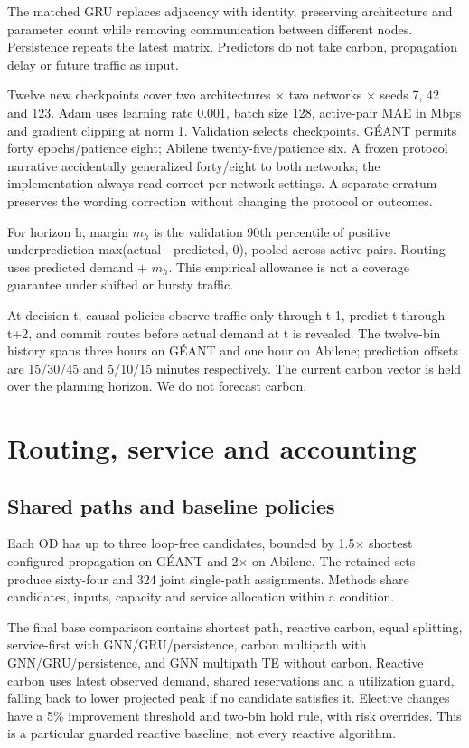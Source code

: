 \documentclass[conference,letterpaper]{IEEEtran}
\begin{document}
The matched GRU replaces adjacency with identity, preserving architecture and parameter count while removing communication between different nodes. Persistence repeats the latest matrix. Predictors do not take carbon, propagation delay or future traffic as input.

Twelve new checkpoints cover two architectures $\times$ two networks $\times$ seeds 7, 42 and 123. Adam uses learning rate 0.001, batch size 128, active-pair MAE in Mbps and gradient clipping at norm 1. Validation selects checkpoints. GÉANT permits forty epochs/patience eight; Abilene twenty-five/patience six. A frozen protocol narrative accidentally generalized forty/eight to both networks; the implementation always read correct per-network settings. A separate erratum preserves the wording correction without changing the protocol or outcomes.

For horizon h, margin $m_h$ is the validation 90th percentile of positive underprediction max(actual - predicted, 0), pooled across active pairs. Routing uses predicted demand + $m_h$. This empirical allowance is not a coverage guarantee under shifted or bursty traffic.

At decision t, causal policies observe traffic only through t-1, predict t through t+2, and commit routes before actual demand at t is revealed. The twelve-bin history spans three hours on GÉANT and one hour on Abilene; prediction offsets are 15/30/45 and 5/10/15 minutes respectively. The current carbon vector is held over the planning horizon. We do not forecast carbon.

\section{Routing, service and accounting}

\subsection{Shared paths and baseline policies}

Each OD has up to three loop-free candidates, bounded by 1.5$\times$ shortest configured propagation on GÉANT and 2$\times$ on Abilene. The retained sets produce sixty-four and 324 joint single-path assignments. Methods share candidates, inputs, capacity and service allocation within a condition.

The final base comparison contains shortest path, reactive carbon, equal splitting, service-first with GNN/GRU/persistence, carbon multipath with GNN/GRU/persistence, and GNN multipath TE without carbon. Reactive carbon uses latest observed demand, shared reservations and a utilization guard, falling back to lower projected peak if no candidate satisfies it. Elective changes have a 5\% improvement threshold and two-bin hold rule, with risk overrides. This is a particular guarded reactive baseline, not every reactive algorithm.
\end{document}
